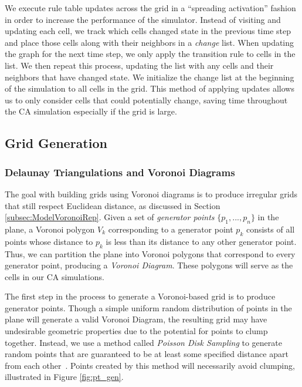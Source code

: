 \documentclass[a4paper,11pt]{article}
\begin{document}
We execute rule table updates across the grid in a ``spreading activation'' fashion in order to increase the performance of the simulator. Instead of visiting and updating each cell, we track which cells changed state in the previous time step and place those cells along with their neighbors in a \textit{change} list. When updating the graph for the next time step, we only apply the transition rule to cells in the list. We then repeat this process, updating the list with any cells and their neighbors that have changed state. We initialize the change list at the beginning of the simulation to all cells in the grid. This method of applying updates allows us to only consider cells that could potentially change, saving time throughout the CA simulation especially if the grid is large. 

\subsection{Grid Generation}
\label{subsec:GridGen}

\subsubsection{Delaunay Triangulations and Voronoi Diagrams}
The goal with building grids using Voronoi diagrams is to produce irregular grids that still respect Euclidean distance, as discussed in Section \ref{subsec:ModelVoronoiRep}. Given a set of \textit{generator points} $\{p_1, ..., p_n\}$ in the plane, a Voronoi polygon $V_k$ corresponding to a generator point $p_k$ consists of all points whose distance to $p_k$ is less than its distance to any other generator point. Thus, we can partition the plane into Voronoi polygons that correspond to every generator point, producing a \textit{Voronoi Diagram}. These polygons will serve as the cells in our CA simulations. 

The first step in the process to generate a Voronoi-based grid is to produce generator points. Though a simple uniform random distribution of points in the plane will generate a valid Voronoi Diagram, the resulting grid may have undesirable geometric properties due to the potential for points to clump together. Instead, we use a method called \textit{Poisson Disk Sampling} to generate random points that are guaranteed to be at least some specified distance apart from each other~\cite{br07}. Points created by this method will necessarily avoid clumping, illustrated in Figure \ref{fig:pt_gen}.
\end{document}
